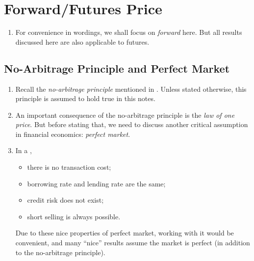 \section{Forward/Futures Price}
\label{sect:fwd-futures-price}
\begin{enumerate}
\item For convenience in wordings, we shall focus on \emph{forward} here. But all
results discussed here are also applicable to futures.
\end{enumerate}
\subsection{No-Arbitrage Principle and Perfect Market}
\begin{enumerate}
\item Recall the \emph{no-arbitrage principle} mentioned in
. Unless stated otherwise, this principle
is assumed to hold true in this notes.
\item An important consequence of the no-arbitrage principle is the \emph{law
of one price}. But before stating that, we need to discuss another critical
assumption in financial economics: \emph{perfect market}.
\item In a ,
\begin{itemize}
\item there is no transaction cost;
\item borrowing rate and lending rate are the same;
\item credit risk does not exist;
\item short selling is always possible.
\end{itemize}
Due to these nice properties of perfect market, working with it would be
convenient, and many ``nice'' results assume the market is perfect (in addition
to the no-arbitrage principle).


\end{enumerate}
